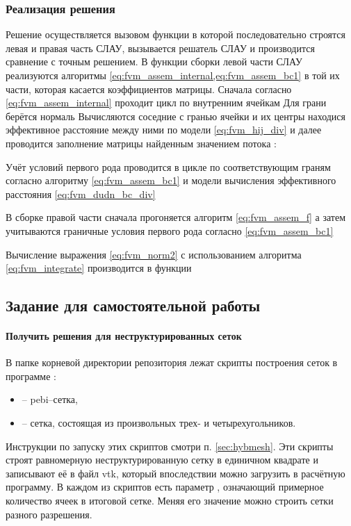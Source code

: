 \subsubsection{Реализация решения}
Решение осуществляется вызовом функции
в которой последовательно строятся левая и правая часть СЛАУ,
вызывается решатель СЛАУ и производится сравнение
с точным решением.
В функции сборки левой части СЛАУ
реализуются алгоритмы \cref{eq:fvm_assem_internal,eq:fvm_assem_bc1}
в той их части, которая касается коэффициентов матрицы.
Сначала согласно \cref{eq:fvm_assem_internal}
проходит цикл по внутренним ячейкам
Для грани берётся нормаль
Вычисляются соседние с гранью ячейки и их центры
находися эффективное расстояние между ними по модели
\cref{eq:fvm_hij_div}
и далее проводится заполнение матрицы найденным значением потока :

Учёт условий первого рода проводится в
цикле по соответствующим граням согласно алгоритму \cref{eq:fvm_assem_bc1}
и модели вычисления эффективного расстояния \cref{eq:fvm_dudn_bc_div}
 
В сборке правой части
сначала прогоняется алгоритм \cref{eq:fvm_assem_f}
а затем учитываются граничные условия первого рода согласно \cref{eq:fvm_assem_bc1}

Вычисление выражения
\cref{eq:fvm_norm2} с использованием
алгоритма \cref{eq:fvm_integrate}
производится в функции

\subsection{Задание для самостоятельной работы}
\label{seq:fvm_poisson_hw}
\paragraph{Получить решения для неструктурированных сеток}
В папке  корневой директории репозитория
лежат скрипты построения сеток в программе :
\begin{itemize}
\item {} -- pebi--сетка,
\item {} -- сетка, состоящая из произвольных трех- и четырехугольников.
\end{itemize}
Инструкции по запуску этих скриптов смотри п. \ref{sec:hybmesh}.
Эти скрипты строят равномерную неструктурированную сетку
в единичном квадрате
и записывают её в файл vtk, который впоследствии можно загрузить
в расчётную программу.
В каждом из скриптов есть параметр , означающий
примерное количество ячеек в итоговой сетке.
Меняя его значение можно строить сетки разного разрешения.

